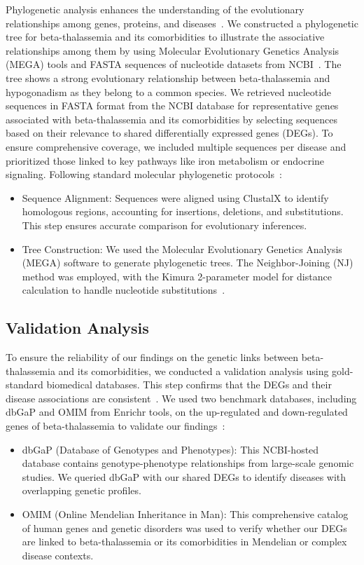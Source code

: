 Phylogenetic analysis enhances the understanding of the evolutionary relationships among genes, proteins, and diseases~\cite{phy_ref1}. We constructed a phylogenetic tree for beta-thalassemia and its comorbidities to illustrate the associative relationships among them by using Molecular Evolutionary Genetics Analysis (MEGA) tools and FASTA sequences of nucleotide datasets from NCBI~\cite{phy_ref1}. The tree shows a strong evolutionary relationship between beta-thalassemia and hypogonadism as they belong to a common species.
We retrieved nucleotide sequences in FASTA format from the NCBI database for representative genes associated with beta-thalassemia and its comorbidities by selecting sequences based on their relevance to shared differentially expressed genes (DEGs). To ensure comprehensive coverage, we included multiple sequences per disease and prioritized those linked to key pathways like iron metabolism or endocrine signaling.
Following standard molecular phylogenetic protocols~\cite{phy_ref2}:
\begin{itemize}
    \item Sequence Alignment: Sequences were aligned using ClustalX to identify homologous regions, accounting for insertions, deletions, and substitutions. This step ensures accurate comparison for evolutionary inferences.
    \item Tree Construction: We used the Molecular Evolutionary Genetics Analysis (MEGA) software to generate phylogenetic trees. The Neighbor-Joining (NJ) method was employed, with the Kimura 2-parameter model for distance calculation to handle nucleotide substitutions~\cite{phy_ref3}.
\end{itemize}

\vspace*{-\parskip}
\subsection{Validation Analysis}
\label{sec:validation}

To ensure the reliability of our findings on the genetic links between beta-thalassemia and its comorbidities, we conducted a validation analysis using gold-standard biomedical databases. This step confirms that the DEGs and their disease associations are consistent~\cite{val_ref1}. We used two benchmark databases, including dbGaP and OMIM from Enrichr tools, on the up-regulated and down-regulated genes of beta-thalassemia to validate our findings~\cite{val_ref1}:
\begin{itemize}
    \item dbGaP (Database of Genotypes and Phenotypes): This NCBI-hosted database contains genotype-phenotype relationships from large-scale genomic studies. We queried dbGaP with our shared DEGs to identify diseases with overlapping genetic profiles.
    \item OMIM (Online Mendelian Inheritance in Man): This comprehensive catalog of human genes and genetic disorders was used to verify whether our DEGs are linked to beta-thalassemia or its comorbidities in Mendelian or complex disease contexts.
\end{itemize}

